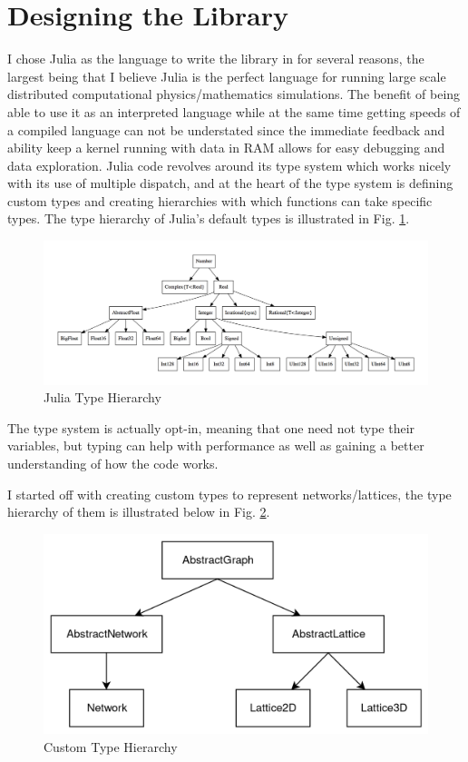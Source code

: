 \section{Designing the Library}
I chose Julia as the language to write the library in for several reasons, the largest being that I believe Julia is the perfect language for running large scale distributed computational physics/mathematics simulations.
The benefit of being able to use it as an interpreted language while at the same time getting speeds of a compiled language can not be understated since the immediate feedback and ability keep a kernel running with data in RAM allows for easy debugging and data exploration.
Julia code revolves around its type system which works nicely with its use of multiple dispatch, and at the heart of the type system is defining custom types and creating hierarchies with which functions can take specific types.
The type hierarchy of Julia's default types is illustrated in Fig. \ref{fig:julia_type_hierarchy}.

\begin{figure}[H]
	\centering
	\includegraphics[width=400pt]{images/julia_type_hierarchy.png}
	\caption{Julia Type Hierarchy}
	\label{fig:julia_type_hierarchy}
\end{figure}

The type system is actually opt-in, meaning that one need not type their variables, but typing can help with performance as well as gaining a better understanding of how the code works.

I started off with creating custom types to represent networks/lattices, the type hierarchy of them is illustrated below in Fig. \ref{fig:custom_type_hierarchy}.

\begin{figure}[H]
	\centering
	\includegraphics[width=350pt]{images/custom_type_hierarchy.png}
	\caption{Custom Type Hierarchy}
	\label{fig:custom_type_hierarchy}
\end{figure}

